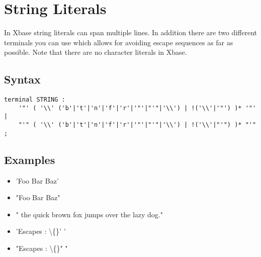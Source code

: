 \documentclass[a4paper,10pt]{scrreprt}
\newlength{\itemindentlen}
\begin{document}
\section{String Literals}
\label{StringLiterals}
In Xbase string literals can span multiple lines. In addition there are two different terminals you can use which allows for avoiding escape sequences as far as possible.
Note that there are no character literals in Xbase.

\subsection{Syntax}

\begin{lstlisting}
terminal STRING	: 
	'"' ( '\\' ('b'|'t'|'n'|'f'|'r'|'"'|"'"|'\\') | !('\\'|'"') )* '"' |
	"'" ( '\\' ('b'|'t'|'n'|'f'|'r'|'"'|"'"|'\\') | !('\\'|"'") )* "'"
;

\end{lstlisting}





\subsection{Examples}


\setlength{\itemindentlen}{\textwidth}
\begin{itemize}
\addtolength{\itemindentlen}{-2em}

\item \begin{minipage}[t]{\itemindentlen}
'Foo Bar Baz'
\end{minipage}

\item \begin{minipage}[t]{\itemindentlen}
"Foo Bar Baz"
\end{minipage}

\item \begin{minipage}[t]{\itemindentlen}
" the quick brown fox 
		   jumps over the lazy dog."
\end{minipage}

\item \begin{minipage}[t]{\itemindentlen}
'Escapes : \textbackslash\{\}' '
\end{minipage}

\item \begin{minipage}[t]{\itemindentlen}
"Escapes : \textbackslash\{\}" "
\end{minipage}

\end{itemize}
\addtolength{\itemindentlen}{2em}
\end{document}
